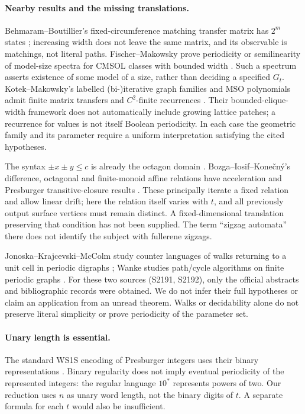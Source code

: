 \documentclass[11pt]{amsart}
\theoremstyle{definition}\newtheorem{definition}{Definition}
\begin{document}
\paragraph{Nearby results and the missing translations.}
Behmaram--Boutillier's fixed-circumference matching transfer matrix
has $2^m$ states \cite[Section 3, Eq.\ (3.1)]{Behmaram}; increasing
width does not leave the same matrix, and its observable is matchings,
not literal paths. Fischer--Makowsky prove periodicity or semilinearity
of model-size spectra for CMSOL classes with bounded width
\cite[Theorems 1.4, 1.7 and 1.10]{Fischer}. Such a spectrum asserts
existence of some model of a size, rather than deciding a specified
$G_t$. Kotek--Makowsky's labelled (bi-)iterative graph families and MSO
polynomials admit finite matrix transfers and $C^2$-finite recurrences
\cite[Definitions 17--20, Lemma 28, Theorems 30 and 32]{Kotek}.
Their bounded-clique-width framework does not automatically include
growing lattice patches; a recurrence for values is not itself
Boolean periodicity. In each case the geometric family and its
parameter require a uniform interpretation satisfying the cited
hypotheses.

The syntax $\pm x\pm y\le c$ is already the octagon domain
\cite[p.~1]{Mine}. Bozga--Iosif--Kone\v{c}n\'y's difference,
octagonal and finite-monoid affine relations have acceleration and
Presburger transitive-closure results
\cite[Definition 1 and Sections 4.2.1--4.2.2]{Bozga}. These principally
iterate a fixed relation and allow linear drift; here the relation
itself varies with $t$, and all previously output surface vertices
must remain distinct. A fixed-dimensional translation preserving that
condition has not been supplied. The term ``zigzag automata'' there
does not identify the subject with fullerene zigzags.

Jonoska--Krajcevski--McColm study counter languages of walks returning
to a unit cell in periodic digraphs \cite{Counter}; Wanke studies
path/cycle algorithms on finite periodic graphs \cite{Wanke}.
For these two sources (S2191, S2192), only the official abstracts and
bibliographic records were obtained. We do not infer their full
hypotheses or claim an application from an unread theorem. Walks or
decidability alone do not preserve literal simplicity or prove
periodicity of the parameter set.

\paragraph{Unary length is essential.}
The standard WS1S encoding of Presburger integers uses their binary
representations \cite[printed pp.~11--12]{Thomas}. Binary regularity
does not imply eventual periodicity of the represented integers:
the regular language $10^*$ represents powers of two. Our reduction
uses $n$ as unary word length, not the binary digits of $t$.
A separate formula for each $t$ would also be insufficient.
\end{document}

